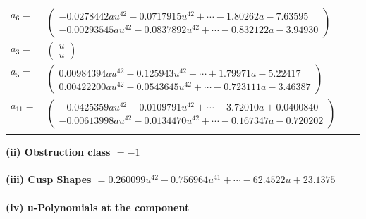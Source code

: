 \documentclass[1p]{elsarticle_modified}
\theoremstyle{definition}
\begin{document}
\begin{tabular}{m{7pt} m{180pt} m{7pt} m{180pt} }
\flushright $a_{6}=$&$\begin{pmatrix}-0.0278442 a u^{42}-0.0717915 u^{42}+\cdots-1.80262 a-7.63595\\-0.00293545 a u^{42}-0.0837892 u^{42}+\cdots-0.832122 a-3.94930\end{pmatrix}$ \\
\flushright $a_{3}=$&$\begin{pmatrix}u\\u\end{pmatrix}$ \\
\flushright $a_{5}=$&$\begin{pmatrix}0.00984394 a u^{42}-0.125943 u^{42}+\cdots+1.79971 a-5.22417\\0.00422200 a u^{42}-0.0543645 u^{42}+\cdots-0.723111 a-3.46387\end{pmatrix}$ \\
\flushright $a_{11}=$&$\begin{pmatrix}-0.0425359 a u^{42}-0.0109791 u^{42}+\cdots-3.72010 a+0.0400840\\-0.00613998 a u^{42}-0.0134470 u^{42}+\cdots-0.167347 a-0.720202\end{pmatrix}$\\&\end{tabular}
\flushleft \textbf{(ii) Obstruction class $= -1$}\\~\\
\flushleft \textbf{(iii) Cusp Shapes $= 0.260099 u^{42}-0.756964 u^{41}+\cdots-62.4522 u+23.1375$}\\~\\
\newpage\renewcommand{\arraystretch}{1}
\flushleft \textbf{(iv) u-Polynomials at the component}\newline \\
\end{document}
